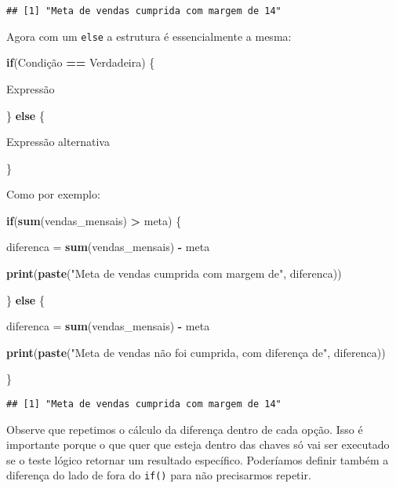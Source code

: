 \documentclass[]{article}
\newenvironment{Shaded}{\begin{snugshade}}{\end{snugshade}}
\newcommand{\ControlFlowTok}[1]{\textcolor[rgb]{0.13,0.29,0.53}{\textbf{#1}}}
\newcommand{\KeywordTok}[1]{\textcolor[rgb]{0.13,0.29,0.53}{\textbf{#1}}}
\newcommand{\NormalTok}[1]{#1}
\newcommand{\OperatorTok}[1]{\textcolor[rgb]{0.81,0.36,0.00}{\textbf{#1}}}
\newcommand{\StringTok}[1]{\textcolor[rgb]{0.31,0.60,0.02}{#1}}
\begin{document}
\begin{verbatim}
## [1] "Meta de vendas cumprida com margem de 14"
\end{verbatim}

Agora com um \texttt{else} a estrutura é essencialmente a mesma:

\begin{Shaded}
\begin{Highlighting}[]
\ControlFlowTok{if}\NormalTok{(Condição }\OperatorTok{==}\StringTok{ }\NormalTok{Verdadeira) \{}
  
\NormalTok{  Expressão}
  
\NormalTok{\} }\ControlFlowTok{else}\NormalTok{ \{}
    
\NormalTok{  Expressão alternativa}
  
\NormalTok{  \}}
\end{Highlighting}
\end{Shaded}

Como por exemplo:

\begin{Shaded}
\begin{Highlighting}[]
\ControlFlowTok{if}\NormalTok{(}\KeywordTok{sum}\NormalTok{(vendas_mensais) }\OperatorTok{>}\StringTok{ }\NormalTok{meta) \{}
  
\NormalTok{  diferenca =}\StringTok{ }\KeywordTok{sum}\NormalTok{(vendas_mensais) }\OperatorTok{-}\StringTok{ }\NormalTok{meta}
  
  \KeywordTok{print}\NormalTok{(}\KeywordTok{paste}\NormalTok{(}\StringTok{"Meta de vendas cumprida com margem de"}\NormalTok{, diferenca))}

\NormalTok{\} }\ControlFlowTok{else}\NormalTok{ \{}
  
\NormalTok{  diferenca =}\StringTok{ }\KeywordTok{sum}\NormalTok{(vendas_mensais) }\OperatorTok{-}\StringTok{ }\NormalTok{meta}
  
  \KeywordTok{print}\NormalTok{(}\KeywordTok{paste}\NormalTok{(}\StringTok{"Meta de vendas não foi cumprida, com diferença de"}\NormalTok{, diferenca))  }
  
\NormalTok{  \}}
\end{Highlighting}
\end{Shaded}

\begin{verbatim}
## [1] "Meta de vendas cumprida com margem de 14"
\end{verbatim}

Observe que repetimos o cálculo da diferença dentro de cada opção. Isso
é importante porque o que quer que esteja dentro das chaves só vai ser
executado se o teste lógico retornar um resultado específico. Poderíamos
definir também a diferença do lado de fora do \texttt{if()} para não
precisarmos repetir.
\end{document}

